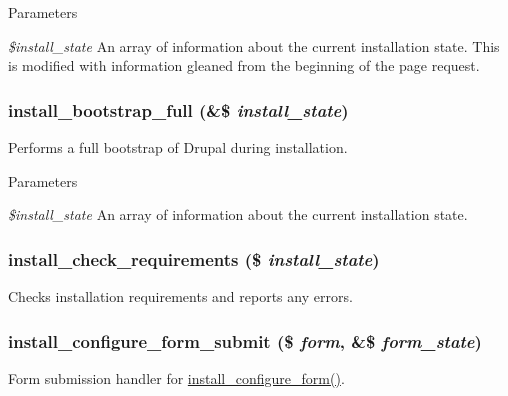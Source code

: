 \begin{DoxyParams}{Parameters}
\item[{\em \$install\_\-state}]An array of information about the current installation state. This is modified with information gleaned from the beginning of the page request. \end{DoxyParams}
\hypertarget{install_8core_8inc_ad5fe84024130a1d93d0238d0c3d2cfb5}{
\subsubsection[{install\_\-bootstrap\_\-full}]{\setlength{\rightskip}{0pt plus 5cm}install\_\-bootstrap\_\-full (\&\$ {\em install\_\-state})}}
\label{install_8core_8inc_ad5fe84024130a1d93d0238d0c3d2cfb5}
Performs a full bootstrap of Drupal during installation.


\begin{DoxyParams}{Parameters}
\item[{\em \$install\_\-state}]An array of information about the current installation state. \end{DoxyParams}
\hypertarget{install_8core_8inc_ae9175b59627ec291ef76fd241f74f33e}{
\subsubsection[{install\_\-check\_\-requirements}]{\setlength{\rightskip}{0pt plus 5cm}install\_\-check\_\-requirements (\$ {\em install\_\-state})}}
\label{install_8core_8inc_ae9175b59627ec291ef76fd241f74f33e}
Checks installation requirements and reports any errors. \hypertarget{install_8core_8inc_ac4774b453669916d9ffbb619b4bf9717}{
\subsubsection[{install\_\-configure\_\-form\_\-submit}]{\setlength{\rightskip}{0pt plus 5cm}install\_\-configure\_\-form\_\-submit (\$ {\em form}, \/  \&\$ {\em form\_\-state})}}
\label{install_8core_8inc_ac4774b453669916d9ffbb619b4bf9717}
Form submission handler for \hyperlink{group__forms_ga38e5d79d667dbc48f40ca4238d6d161b}{install\_\-configure\_\-form()}.


